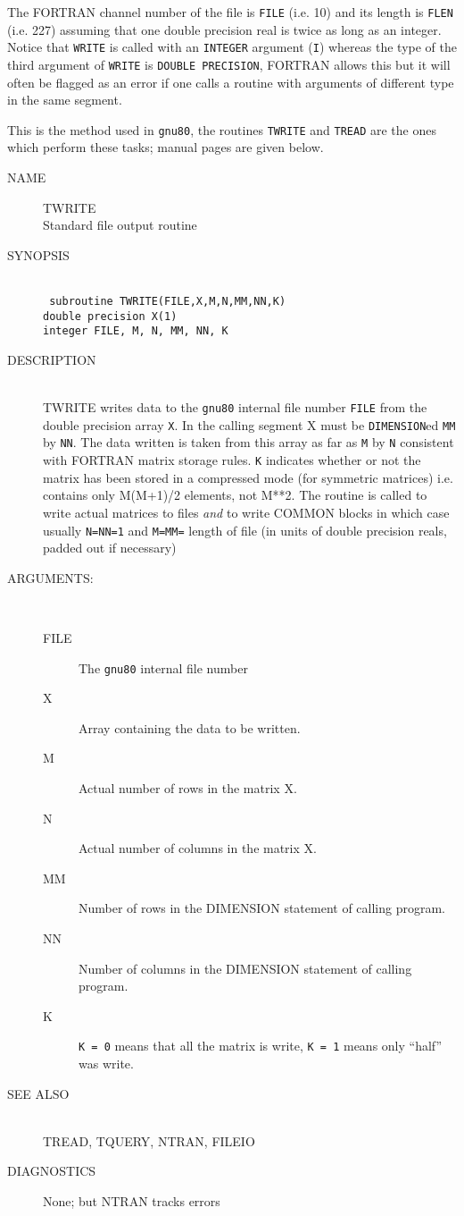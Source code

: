 The FORTRAN channel number of the file is {\tt FILE} (i.e. 10)
and its length is {\tt FLEN} (i.e. 227) assuming that
one double precision real is twice as long as an integer.
Notice that {\tt WRITE} is called with an {\tt INTEGER} argument ({\tt I})
whereas the type of the third argument of {\tt WRITE} is 
{\tt DOUBLE PRECISION}, FORTRAN allows this but it will often be
flagged as an error if one calls a routine with arguments of different
type in the same segment.

This is the method used in {\tt gnu80}, the routines {\tt TWRITE} and
{\tt TREAD} are the ones which perform these tasks; manual pages are 
given below.
\newpage
\begin{description}
\item[NAME] TWRITE \\
Standard file output routine
\item[SYNOPSIS] \ \\
{\tt
   subroutine TWRITE(FILE,X,M,N,MM,NN,K) \\
   double precision X(1) \\
   integer FILE, M, N, MM, NN, K \\
}
\item[DESCRIPTION] \ \\
TWRITE writes data to the {\tt gnu80} internal file number {\tt FILE}
from the double precision array {\tt X}. In the calling segment
X must be {\tt DIMENSION}ed {\tt MM} by {\tt NN}. The data written
is taken from this array as far as {\tt M} by {\tt N} consistent
with FORTRAN matrix storage rules. {\tt K} indicates whether or
not the matrix has been stored in a compressed mode (for symmetric
matrices) i.e. contains only M(M+1)/2 elements, not M**2.
The routine is called to write actual matrices to files {\em and}
to write COMMON blocks in which case usually {\tt N=NN=1}
and {\tt M=MM=} length of file (in units of double precision reals,
padded out if necessary)
\item[ARGUMENTS:] \ \\
\begin{description}
\item[FILE]  The {\tt gnu80} internal file number
\item[X] Array containing the data to be written.
\item[M] Actual number of rows in the matrix X.
\item[N] Actual number of columns in the matrix X.
\item[MM] Number of rows in the DIMENSION statement of calling program.
\item[NN] Number of columns in the DIMENSION statement of calling program.
\item[K] {\tt K = 0} means that all the matrix is write, {\tt K = 1}
means only ``half'' was write.
\end{description}
\item[SEE ALSO] \ \\
TREAD, TQUERY, NTRAN, FILEIO
\item[DIAGNOSTICS]
None; but NTRAN tracks errors
\end{description}
